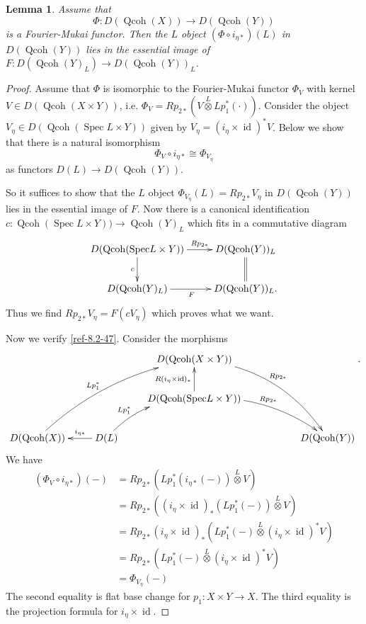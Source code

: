 \documentclass{amsart}
\numberwithin{equation}{section}
\newtheorem{lemma}{Lemma}[section]
\theoremstyle{definition}
\theoremstyle{remark}
\begin{document}
\begin{lemma}
\label{ref-8.3-46}
Assume that
\[
\Phi:D({\operatorname{Qcoh}}(X)){\rightarrow} D({\operatorname{Qcoh}}(Y))
\]
is a Fourier-Mukai functor. Then the $L$ object $(\Phi\circ i_{\eta\ast})(L)$ in $D({\operatorname{Qcoh}}(Y))$
lies in the essential image of $F:D({\operatorname{Qcoh}}(Y)_L){\rightarrow} D({\operatorname{Qcoh}}(Y))_L$.
\end{lemma}
\begin{proof}
Assume that $\Phi$ is isomorphic to the Fourier-Mukai functor $\Phi_V$ with kernel $V\in D({\operatorname{Qcoh}}(X\times Y))$, i.e. $\Phi_V = Rp_{2*}(V\stackrel{L}{\otimes}Lp_1^*(\cdot))$. 
Consider the object $V_\eta\in D({\operatorname{Qcoh}}({\operatorname {Spec}} L\times Y))$ given by  $V_\eta=(i_{\eta}\times{{\operatorname {id}}})^*V$. Below we show that there is a natural isomorphism
\begin{equation}
\label{ref-8.2-47}
\Phi_V\circ i_{\eta\ast}\cong \Phi_{V_\eta}
\end{equation}
as functors $D(L){\rightarrow} D({\operatorname{Qcoh}}(Y))$.

So it suffices to show that the $L$ object $\Phi_{V_\eta}(L)=Rp_{2\ast} V_\eta$ in $D({\operatorname{Qcoh}}(Y))$ lies in the essential image of $F$. Now 
there is a canonical identification $c:{\operatorname{Qcoh}}({\operatorname {Spec}} L\times Y)){\rightarrow} {\operatorname{Qcoh}}(Y)_L$ which fits in 
a  commutative diagram
\[
\xymatrix{
D({\operatorname{Qcoh}}({\operatorname {Spec}} L\times Y))\ar[d]_{c}\ar[r]^-{Rp_{2\ast}} & D({\operatorname{Qcoh}}(Y))_L\ar@{=}[d]\\
D({\operatorname{Qcoh}}(Y)_L)\ar[r]_F& D({\operatorname{Qcoh}}(Y))_L.
}
\]
Thus we find $Rp_{2\ast} V_\eta=F(cV_\eta)$ which proves what we want.

\medskip

Now we verify \eqref{ref-8.2-47}. Consider the morphisms
\[
\xymatrix{
&& D({\operatorname{Qcoh}}(X\times Y))\ar@/^7mm/[ddrr]^{Rp_{2*}} \\
&& D({\operatorname{Qcoh}}({\operatorname {Spec}} L\times Y)) \ar[u]^-{R(i_{\eta}\times {{\operatorname {id}}})_*} \ar@/^5mm/[drr]^{R{{p}}_{2*}} 
\\
D({\operatorname{Qcoh}}(X))\ar@/^5mm/[uurr]^-{Lp_1^*} & D(L)\ar@/^4mm/[ur]^-{L{{p}}_1^*} \ar[l]_-{i_{\eta\ast}}& &
& D({\operatorname{Qcoh}}(Y))
}.
\]
We have
\begin{align*}
(\Phi_V\circ i_{\eta\ast})(-) &= Rp_{2*}(Lp_1^*(i_{\eta\ast}(-))\stackrel{L}{\otimes} V) \\
&= Rp_{2*}((i_{\eta}\times{{\operatorname {id}}})_*(Lp_1^*(-))\stackrel{L}{\otimes} V) \\
&= Rp_{2*} (i_{\eta}\times{{\operatorname {id}}})_* (Lp_1^*(-)\stackrel{L}{\otimes} (i_{\eta}\times{{\operatorname {id}}})^*V) \\
&= Rp_{2*} (Lp_1^*(-)\stackrel{L}{\otimes} (i_{\eta}\times{{\operatorname {id}}})^*V)\\
&=\Phi_{V_\eta}(-)
\end{align*}
The second equality is flat base change for $p_1:X\times Y{\rightarrow} X$. The third equality is the projection formula \cite[Prop.\ 3.9.4]{Lipman} for $i_\eta\times {{\operatorname {id}}}$.
\end{proof}
\end{document}
